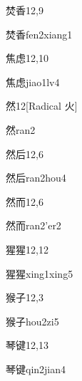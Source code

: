 \begin{entry}{焚香}{12,9}
  \begin{phonetics}{焚香}{fen2xiang1}
  \end{phonetics}
\end{entry}

\begin{entry}{焦虑}{12,10}
  \begin{phonetics}{焦虑}{jiao1lv4}
  \end{phonetics}
\end{entry}

\begin{entry}{然}{12}[Radical 火]
  \begin{phonetics}{然}{ran2}
  \end{phonetics}
\end{entry}

\begin{entry}{然后}{12,6}
  \begin{phonetics}{然后}{ran2hou4}
  \end{phonetics}
\end{entry}

\begin{entry}{然而}{12,6}
  \begin{phonetics}{然而}{ran2'er2}
  \end{phonetics}
\end{entry}

\begin{entry}{猩猩}{12,12}
  \begin{phonetics}{猩猩}{xing1xing5}
  \end{phonetics}
\end{entry}

\begin{entry}{猴子}{12,3}
  \begin{phonetics}{猴子}{hou2zi5}
  \end{phonetics}
\end{entry}

\begin{entry}{琴键}{12,13}
  \begin{phonetics}{琴键}{qin2jian4}
  \end{phonetics}
\end{entry}

